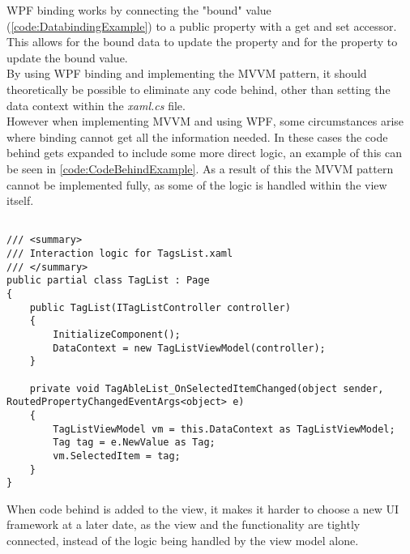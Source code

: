 WPF binding works by connecting the "bound" value (\autoref{code:DatabindingExample}) to a public property with a get and set accessor. This allows for the bound data to update the property and for the property to update the bound value. \\
By using WPF binding and implementing the MVVM pattern, it should theoretically be possible to eliminate any code behind, other than setting the data context within the \textit{xaml.cs} file. \\
However when implementing MVVM and using WPF, some circumstances arise where binding cannot get all the information needed. In these cases the code behind gets expanded to include some more direct logic, an example of this can be seen in \autoref{code:CodeBehindExample}. As a result of this the MVVM pattern cannot be implemented fully, as some of the logic is handled within the view itself.

\begin{listing}[H]
\begin{verbatim}

/// <summary>
/// Interaction logic for TagsList.xaml
/// </summary>
public partial class TagList : Page
{
    public TagList(ITagListController controller)
    {
        InitializeComponent();
        DataContext = new TagListViewModel(controller);
    }
    
    private void TagAbleList_OnSelectedItemChanged(object sender, RoutedPropertyChangedEventArgs<object> e)
    {
        TagListViewModel vm = this.DataContext as TagListViewModel;
        Tag tag = e.NewValue as Tag;
        vm.SelectedItem = tag;
    }
}
\end{verbatim}
\label{code:CodeBehindExample}
\end{listing}

When code behind is added to the view, it makes it harder to choose a new UI framework at a later date, as the view and the functionality are tightly connected, instead of the logic being handled by the view model alone.

